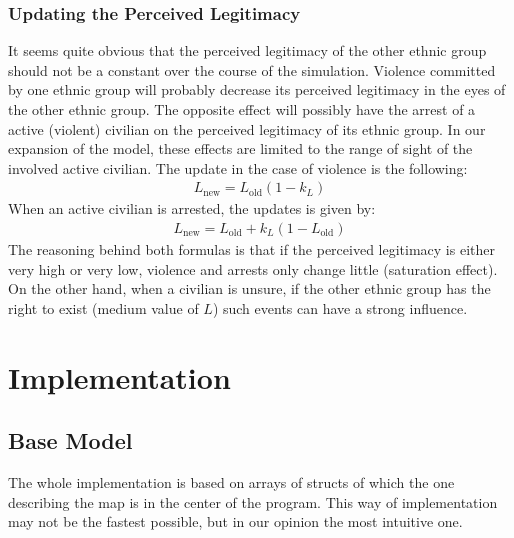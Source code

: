 \documentclass[11pt]{article}
\begin{document}
\subsubsection{Updating the Perceived Legitimacy}
It seems quite obvious that the perceived legitimacy of the other ethnic group should not be a constant over the course of the simulation. Violence committed by one ethnic group will probably decrease its perceived legitimacy in the eyes of the other ethnic group. The opposite effect will possibly have the arrest of a active (violent) civilian on the perceived legitimacy of its ethnic group. In our expansion of the model, these effects are limited to the range of sight of the involved active civilian. The update in the case of violence is the following:
\begin{align}
L_{\text{new}} = L_{\text{old}} \left( 1 - k_L \right)
\end{align}
When an active civilian is arrested, the updates is given by:
\begin{align}
L_{\text{new}} = L_{\text{old}} + k_L \left( 1 - L_{\text{old}} \right)
\end{align}
The reasoning behind both formulas is that if the perceived legitimacy is either very high or very low, violence and arrests only change little (saturation effect). On the other hand, when a civilian is unsure, if the other ethnic group has the right to exist (medium value of $L$) such events can have a strong influence.

\section{Implementation}

\subsection{Base Model}
The whole implementation is based on arrays of structs of which the one describing the map is in the center of the program. This way of implementation may not be the fastest possible, but in our opinion the most intuitive one.
\end{document}
